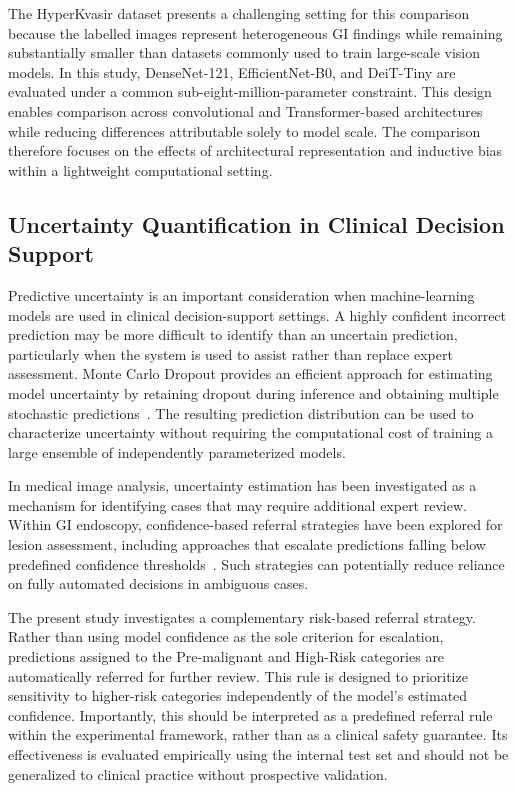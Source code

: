 \documentclass[11pt,a4paper]{article}
\begin{document}
The HyperKvasir dataset presents a challenging setting for this comparison
because the labelled images represent heterogeneous GI findings while
remaining substantially smaller than datasets commonly used to train
large-scale vision models. In this study, DenseNet-121, EfficientNet-B0, and
DeiT-Tiny are evaluated under a common sub-eight-million-parameter constraint.
This design enables comparison across convolutional and Transformer-based
architectures while reducing differences attributable solely to model scale.
The comparison therefore focuses on the effects of architectural
representation and inductive bias within a lightweight computational setting.

\subsection{Uncertainty Quantification in Clinical Decision Support}
Predictive uncertainty is an important consideration when machine-learning
models are used in clinical decision-support settings. A highly confident
incorrect prediction may be more difficult to identify than an uncertain
prediction, particularly when the system is used to assist rather than replace
expert assessment. Monte Carlo Dropout provides an efficient approach for
estimating model uncertainty by retaining dropout during inference and
obtaining multiple stochastic predictions~\citep{Gal2016}. The resulting
prediction distribution can be used to characterize uncertainty without
requiring the computational cost of training a large ensemble of independently
parameterized models.

In medical image analysis, uncertainty estimation has been investigated as a
mechanism for identifying cases that may require additional expert review.
Within GI endoscopy, confidence-based referral strategies have been explored
for lesion assessment, including approaches that escalate predictions falling
below predefined confidence thresholds~\citep{Ebigbo2019}. Such strategies
can potentially reduce reliance on fully automated decisions in ambiguous
cases.

The present study investigates a complementary risk-based referral strategy.
Rather than using model confidence as the sole criterion for escalation,
predictions assigned to the Pre-malignant and High-Risk categories are
automatically referred for further review. This rule is designed to prioritize
sensitivity to higher-risk categories independently of the model's estimated
confidence. Importantly, this should be interpreted as a
predefined referral rule within the experimental framework, rather
than as a clinical safety guarantee. Its effectiveness is evaluated
empirically using the internal test set and should not be generalized to
clinical practice without prospective validation.
\end{document}

